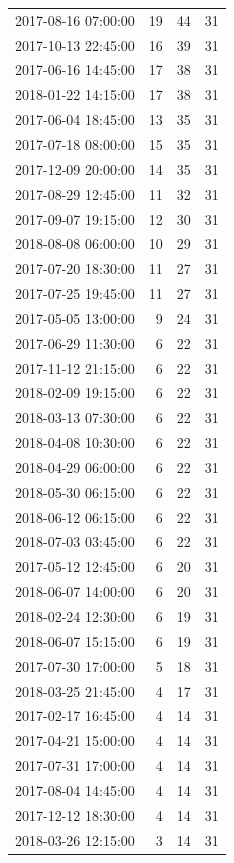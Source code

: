 \begin{tabular}{lrrr}
2017-08-16 07:00:00 & 19 & 44 & 31 \\
2017-10-13 22:45:00 & 16 & 39 & 31 \\
2017-06-16 14:45:00 & 17 & 38 & 31 \\
2018-01-22 14:15:00 & 17 & 38 & 31 \\
2017-06-04 18:45:00 & 13 & 35 & 31 \\
2017-07-18 08:00:00 & 15 & 35 & 31 \\
2017-12-09 20:00:00 & 14 & 35 & 31 \\
2017-08-29 12:45:00 & 11 & 32 & 31 \\
2017-09-07 19:15:00 & 12 & 30 & 31 \\
2018-08-08 06:00:00 & 10 & 29 & 31 \\
2017-07-20 18:30:00 & 11 & 27 & 31 \\
2017-07-25 19:45:00 & 11 & 27 & 31 \\
2017-05-05 13:00:00 & 9 & 24 & 31 \\
2017-06-29 11:30:00 & 6 & 22 & 31 \\
2017-11-12 21:15:00 & 6 & 22 & 31 \\
2018-02-09 19:15:00 & 6 & 22 & 31 \\
2018-03-13 07:30:00 & 6 & 22 & 31 \\
2018-04-08 10:30:00 & 6 & 22 & 31 \\
2018-04-29 06:00:00 & 6 & 22 & 31 \\
2018-05-30 06:15:00 & 6 & 22 & 31 \\
2018-06-12 06:15:00 & 6 & 22 & 31 \\
2018-07-03 03:45:00 & 6 & 22 & 31 \\
2017-05-12 12:45:00 & 6 & 20 & 31 \\
2018-06-07 14:00:00 & 6 & 20 & 31 \\
2018-02-24 12:30:00 & 6 & 19 & 31 \\
2018-06-07 15:15:00 & 6 & 19 & 31 \\
2017-07-30 17:00:00 & 5 & 18 & 31 \\
2018-03-25 21:45:00 & 4 & 17 & 31 \\
2017-02-17 16:45:00 & 4 & 14 & 31 \\
2017-04-21 15:00:00 & 4 & 14 & 31 \\
2017-07-31 17:00:00 & 4 & 14 & 31 \\
2017-08-04 14:45:00 & 4 & 14 & 31 \\
2017-12-12 18:30:00 & 4 & 14 & 31 \\
2018-03-26 12:15:00 & 3 & 14 & 31 \\

\end{tabular}
